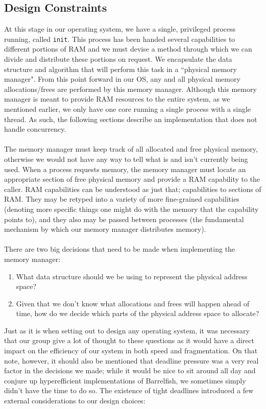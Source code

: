 \subsection{Design Constraints}\label{m1-0}
At this stage in our operating system, we have a single, privileged process running, called \texttt{init}. This process has been handed several capabilities to different portions of RAM and we must devise a method through which we can divide and distribute these portions on request. We encapsulate the data structure and algorithm that will perform this task in a ``physical memory manager". From this point forward in our OS, any and all physical memory allocations/frees are performed by this memory manager. Although this memory manager is meant to provide RAM resources to the entire system, as we mentioned earlier, we only have one core running a single process with a single thread. As such, the following sections describe an implementation that does not handle concurrency.
\\\\
The memory manager must keep track of all allocated and free physical memory, otherwise we would not have any way to tell what is and isn't currently being used. When a process requests memory, the memory manager must locate an appropriate section of free physical memory and provide a RAM capability to the caller. RAM capabilities can be understood as just that; capabilities to sections of RAM. They may be retyped into a variety of more fine-grained capabilities (denoting more specific things one might do with the memory that the capability points to), and they also may be passed between processes (the fundamental mechanism by which our memory manager distributes memory).
\\\\
There are two big decisions that need to be made when implementing the memory manager:
\begin{enumerate}[itemsep=0pt]
    \item What data structure should we be using to represent the physical address space? 
    \item Given that we don't know what allocations and frees will happen ahead of time, how do we decide which parts of the physical address space to allocate?
\end{enumerate}
Just as it is when setting out to design any operating system, it was necessary that our group give a lot of thought to these questions as it would have a direct impact on the efficiency of our system in both speed and fragmentation. On that note, however, it should also be mentioned that deadline pressure was a very real factor in the decisions we made; while it would be nice to sit around all day and conjure up hyperefficient implementations of Barrelfish, we sometimes simply didn't have the time to do so. The existence of tight deadlines introduced a few external considerations to our design choices:

